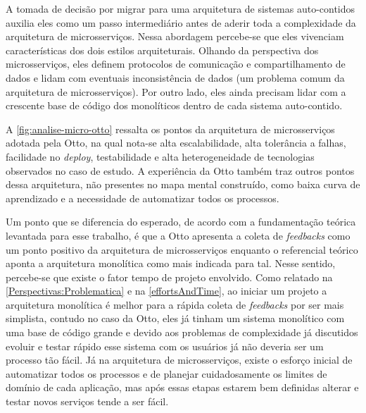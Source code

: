 A tomada de decisão por migrar para uma arquitetura de sistemas auto-contidos auxilia eles como um
passo intermediário antes de aderir toda a complexidade da arquitetura de microsserviços. Nessa
abordagem percebe-se que eles vivenciam características dos dois estilos arquiteturais. Olhando da
perspectiva dos microsserviços, eles definem protocolos de comunicação e compartilhamento de dados e lidam
com eventuais inconsistência de dados (um problema comum da arquitetura de microsserviços). Por
outro lado, eles ainda precisam lidar com a crescente base de código dos monolíticos dentro de cada
sistema auto-contido.

A \autoref{fig:analise-micro-otto} ressalta os pontos da arquitetura de microsserviços
adotada pela Otto, na qual nota-se alta escalabilidade, alta tolerância a falhas, facilidade no
\textit{deploy}, testabilidade e alta heterogeneidade de tecnologias observados no caso de estudo.
A experiência da Otto também traz outros pontos dessa arquitetura, não presentes no mapa mental
construído, como baixa curva de aprendizado e a necessidade de automatizar todos os processos.  

Um ponto que se diferencia do esperado, de acordo com a fundamentação teórica levantada para esse
trabalho, é que a Otto apresenta a coleta de \textit{feedbacks} como um ponto positivo da
arquitetura de microsserviços enquanto o referencial teórico aponta a arquitetura monolítica como
mais indicada para tal. Nesse sentido, percebe-se que existe o fator tempo de projeto envolvido.
Como relatado na \autoref{Perspectivas:Problematica} e na \autoref{effortsAndTime}, ao iniciar um
projeto a arquitetura monolítica é melhor para a rápida coleta de \textit{feedbacks} por ser mais
simplista, contudo no caso da Otto, eles já tinham um sistema monolítico com uma base de código
grande e devido aos problemas de complexidade já discutidos evoluir e testar rápido esse sistema com
os usuários já não deveria ser um processo tão fácil. Já na arquitetura de microsserviços, existe o
esforço inicial de automatizar todos os processos e de planejar cuidadosamente os limites de domínio
de cada aplicação, mas após essas etapas estarem bem definidas alterar e testar novos serviços tende
a ser fácil.


